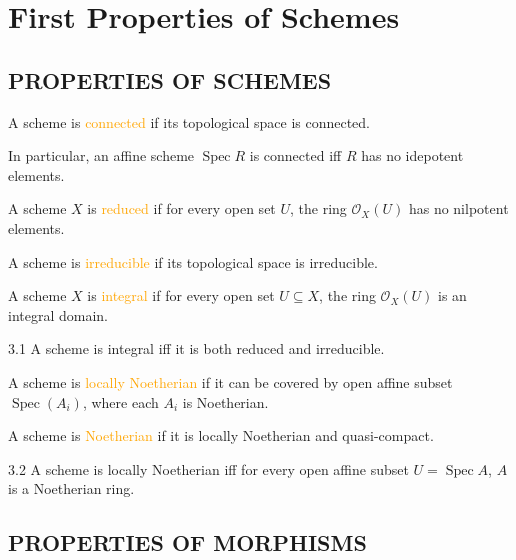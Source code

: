\chapter{First Properties of Schemes}

\section*{PROPERTIES OF SCHEMES}

\begin{definition}
	A scheme is \textcolor{orange}{connected} if its topological space is connected.
	
	In particular, an affine scheme $\operatorname{Spec}R$ is connected iff $R$ has no idepotent elements.
\end{definition}

\begin{definition}
	A scheme $X$ is \textcolor{orange}{reduced} if for every open set $U$, the ring $\mathcal{O}_X(U)$ has no nilpotent elements.
	
	A scheme is \textcolor{orange}{irreducible} if its topological space is irreducible.
	
	A scheme $X$ is \textcolor{orange}{integral} if for every open set $U\subseteq X$, the ring $\mathcal{O}_X(U)$ is an integral domain.
\end{definition}

\begin{proposition}{3.1}
	A scheme is integral iff it is both reduced and irreducible.
\end{proposition}

\begin{definition}
	A scheme is \textcolor{orange}{locally Noetherian} if it can be covered by open affine subset $\operatorname{Spec}\!\left(A_i\right)$, where each $A_i$ is Noetherian.
	
	A scheme is \textcolor{orange}{Noetherian} if it is locally Noetherian and quasi-compact.
\end{definition}

\begin{proposition}{3.2}
	A scheme is locally Noetherian iff for every open affine subset $U=\operatorname{Spec}A$, $A$ is a Noetherian ring.
\end{proposition}

\section*{PROPERTIES OF MORPHISMS}

